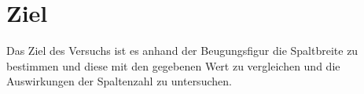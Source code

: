 \section{Ziel}
Das Ziel des Versuchs ist es anhand der Beugungsfigur die Spaltbreite zu bestimmen und diese mit den gegebenen Wert zu vergleichen und die Auswirkungen der Spaltenzahl zu untersuchen.
\label{sec:Ziel}
